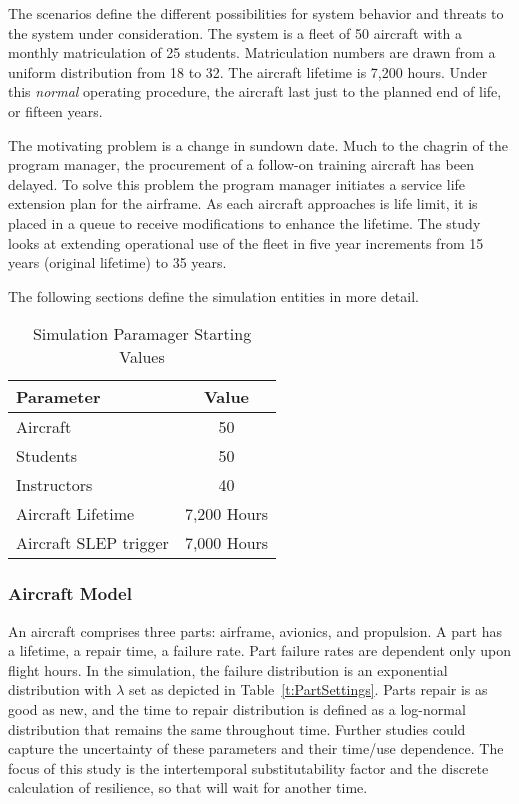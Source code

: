 The scenarios define the different possibilities for system behavior
and threats to the system under consideration. The system is a fleet
of 50 aircraft with a monthly matriculation of
25 students. Matriculation numbers are drawn from a uniform
distribution from 18 to 32.  The aircraft lifetime is 7,200 hours. Under this
\emph{normal} operating procedure, the  
aircraft last just to the planned end of life, or fifteen years.

The motivating problem is a change in sundown date. Much to the
chagrin of the program manager, the procurement of a follow-on
training aircraft has been delayed. To solve this problem the program manager
initiates a service life extension plan for the airframe. As each
aircraft approaches is life limit, it is placed in a queue to receive
modifications to enhance the lifetime. The study looks at extending
operational use of the fleet in five year increments from 15 years
(original lifetime) to 35 years.

The following sections define the simulation entities in more detail.

\begin{table}[h]
    \centering
    \begin{tabular}{l c }
      \hline
      \hline
      \textbf{Parameter} & \textbf{Value} \\
      \hline
      Aircraft & 50 \\
      Students & 50 \\
      Instructors & 40 \\
      Aircraft Lifetime & 7,200 Hours \\
      Aircraft SLEP trigger & 7,000 Hours \\
      \hline
    \end{tabular}
    \caption{Simulation Paramager Starting Values }
  \label{t:StartingValues}
\end{table}

\subsubsection{Aircraft Model}
An aircraft comprises three parts: airframe, avionics, and
propulsion. A part has a lifetime, a repair time, a failure rate. Part
failure rates are dependent only upon flight hours. In the simulation,
the failure distribution is an exponential distribution with $\lambda$
set as depicted in Table~\ref{t:PartSettings}. Parts repair is
as good as new, and the time to repair distribution is defined as a
log-normal distribution that remains the same throughout time. Further
studies could capture the uncertainty of these parameters and their
time/use dependence. The focus of this study is the intertemporal
substitutability factor and the discrete calculation of resilience, so
that will wait for another time.

